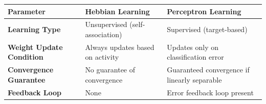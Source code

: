 \documentclass[12pt,a4paper]{article}
\renewcommand{\arraystretch}{1.45}
\begin{document}
\begin{tcolorbox}[tikzbox, title={Comparison of Learning Rules}]
\centering
{\renewcommand{\arraystretch}{1.55}%
\begin{tabularx}{\linewidth}{|>{\bfseries}B{3.2cm}|Y|Y|}
\hline
Parameter & Hebbian Learning & Perceptron Learning \\
\hline
Learning Type & Unsupervised (self-association) & Supervised (target-based) \\
\hline
Weight Update Condition & Always updates based on activity & Updates only on classification error \\
\hline
Convergence Guarantee & No guarantee of convergence & Guaranteed convergence if linearly separable \\[4pt]
\hline
Feedback Loop & None & Error feedback loop present \\
\hline
\end{tabularx}}
\end{tcolorbox}
\end{document}
